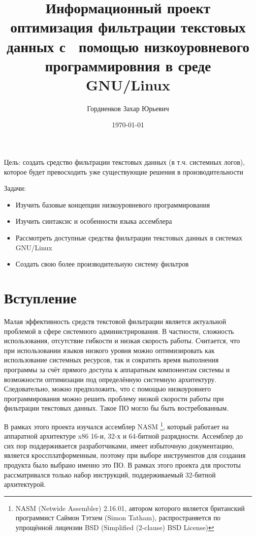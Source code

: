 \documentclass[a4paper]{article}
\title{Информационный проект \flqq{}оптимизация фильтрации текстовых данных с \
	помощью низкоуровневого программировния в среде GNU/Linux\frqq{}}
\author{%
Гордиенков Захар Юрьевич}
\date{\today}
\begin{document}
\maketitle
\pagebreak
{\tableofcontents}
\pagebreak

Цель: создать средство фильтрации текстовых данных (в т.ч. системных логов),
которое будет превосходить уже существующие решения в
производительности

Задачи:
\begin{itemize}
	\item Изучить базовые концепции низкоуровневого программирования
	\item Изучить синтаксис и особенности языка ассемблера
	\item Рассмотреть доступные средства фильтрации текстовых данных в
	системах GNU/Linux
	\item Создать свою более производительную систему фильтров
\end{itemize}

\pagebreak
\section{Вступление}
	Малая эффективность средств текстовой фильтрации является актуальной
	проблемой в сфере системного администрирования. В частности, сложность
	использования, отсутствие гибкости и низкая скорость работы. Считается,
	что при использовании языков низкого уровня можно оптимизировать как
	использование системных ресурсов, так и сократить время выполнения
	программы за счёт прямого доступа к аппаратным компонентам системы и
	возможности оптимизации под определённую системную архитектуру.
	Следовательно, можно предположить, что с помощью низкоуровнего
	программирования можно решить проблему низкой скорости работы при
	фильтрации текстовых данных. Такое ПО могло бы быть востребованным.

	В рамках этого проекта изучался ассемблер NASM
	\footnote{NASM (Netwide Assembler) 2.16.01, автором которого является
	британский программист Саймон Тэтхем (Simon Tatham), распространяется
	по упрощённой лицензии BSD (Simplified (2-clause) BSD License)},
	который работает на аппаратной архитектуре x86 16-и, 32-х и 64-битной
	разрядности. Ассемблер до сих пор поддерживается разработчиками, имеет
	избыточную документацию, является кроссплатформенным, поэтому при выборе
	инструментов для создания продукта было выбрано именно это ПО. В рамках
	этого проекта для простоты рассматривался только набор инструкций,
	поддерживаемый 32-битной архитектурой.
\pagebreak
\end{document}
